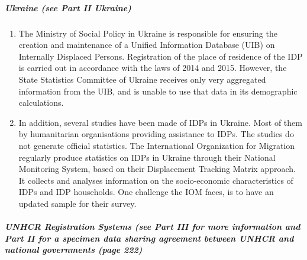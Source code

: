 \documentclass[
]{article}
\begin{document}
\hypertarget{ukraine-see-part-ii-ukraine}{%
\subparagraph{Ukraine (see Part II Ukraine)}\label{ukraine-see-part-ii-ukraine}}

\begin{enumerate}
\def\labelenumi{\arabic{enumi}.}
\setcounter{enumi}{183}
\item
  The Ministry of Social Policy in Ukraine is responsible for
  ensuring the creation and maintenance of a Unified Information
  Database (UIB) on Internally Displaced Persons. Registration of the
  place of residence of the IDP is carried out in accordance with the
  laws of 2014 and 2015. However, the State Statistics Committee of
  Ukraine receives only very aggregated information from the UIB, and
  is unable to use that data in its demographic calculations.
\item
  In addition, several studies have been made of IDPs in Ukraine.
  Most of them by humanitarian organisations providing assistance to
  IDPs. The studies do not generate official statistics. The
  International Organization for Migration regularly produce
  statistics on IDPs in Ukraine through their National Monitoring
  System, based on their Displacement Tracking Matrix approach. It
  collects and analyses information on the socio-economic
  characteristics of IDPs and IDP households. One challenge the IOM
  faces, is to have an updated sample for their survey.
\end{enumerate}

\hypertarget{unhcr-registration-systems-see-part-iii-for-more-information-and-part-ii-for-a-specimen-data-sharing-agreement-between-unhcr-and-national-governments-page-222}{%
\subparagraph{UNHCR Registration Systems (see Part III for more information and Part II for a specimen data sharing agreement between UNHCR and national governments (page 222)}\label{unhcr-registration-systems-see-part-iii-for-more-information-and-part-ii-for-a-specimen-data-sharing-agreement-between-unhcr-and-national-governments-page-222}}
\end{document}
